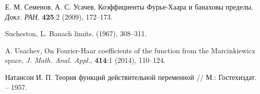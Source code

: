 \documentclass[12pt]{article}
\begin{document}
\begin{thebibliography}{10}
{ Е. М. Семенов, А. С. Усачев},
{Коэффициенты Фурье-Хаара и банаховы пределы},
\newblock \textit{ Докл. РАН}, \textbf{425}:2 (2009), 172--173.

{\sc Sucheston, L.}
\newblock Banach limits.
 (1967), 308--311.

{A. Usachev},
{On Fourier-Haar coefficients of the function from the Marcinkiewicz space},
\newblock \textit{J. Math. Anal. Appl.}, \textbf{414}:1 (2014), 110--124.

Натансон И. П. Теория функций действительной переменной //  М.: Гостехиздат. – 1957.
%



\end{thebibliography}
\end{document}
